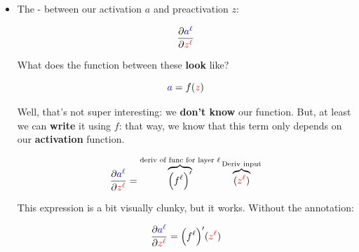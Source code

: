         \begin{itemize}
            \item The  - between our activation $a$ and preactivation $z$:
            
                \begin{equation}
                    \frac{\partial \textcolor{blue}{a^\ell}}{\partial \textcolor{red}{z^\ell}}
                \end{equation}
                
                What does the function between these \textbf{look} like?
                
                \begin{equation}
                    \textcolor{blue}{a} = f(\textcolor{red}{z})
                \end{equation}
                
                Well, that's not super interesting: we \textbf{don't know }our function. But, at least we can \textbf{write} it using $f$: that way, we know that this term only depends on our \textbf{activation} function.
                
                \begin{equation}
                    \frac{\partial \textcolor{blue}{a^\ell}}{\partial \textcolor{red}{z^\ell}} 
                    = 
                    \overbrace{
                    \Big(
                        f^\ell 
                    \Big)'
                    }^{\text{deriv of func for layer $\ell$}}
                    \overbrace{
                    (
                        \textcolor{red}{z^\ell}
                    )
                    }^{\text{Deriv input}}
                \end{equation}
                
                This expression is a bit visually clunky, but it works. Without the annotation:

                \begin{equation}
                    \frac{\partial \textcolor{blue}{a^\ell}}{\partial \textcolor{red}{z^\ell}} 
                    = 
                    \Big(
                        f^\ell 
                    \Big)'
                    (
                        \textcolor{red}{z^\ell}
                    )
                \end{equation}
                
        \end{itemize}
        
